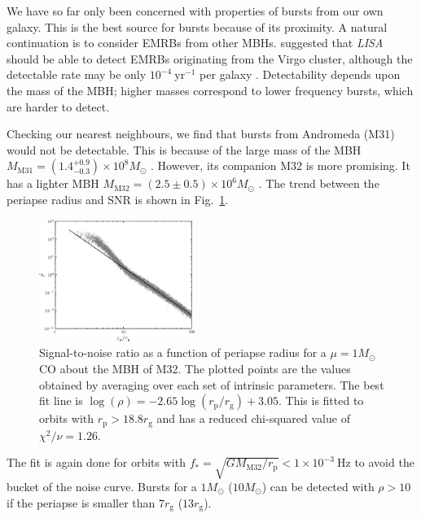 \documentclass[useAMS,usedcolumn,usegraphicx,usenatbib]{mn2e}
\newcommand{\figref}[1]{Fig.~\ref{fig:#1}}
\newcommand{\units}[1]{\ensuremath{~\mathrm{#1}}}
\newcommand{\sub}[1]{\ensuremath{_\mathrm{#1}}}
\begin{document}
We have so far only been concerned with properties of bursts from our own galaxy. This is the best source for bursts because of its proximity. A natural continuation is to consider EMRBs from other MBHs. \citet{Rubbo2006} suggested that \textit{LISA} should be able to detect EMRBs originating from the Virgo cluster, although the detectable rate may be only $10^{-4}\units{yr^{-1}}$ per galaxy \citep{Hopman2007}. Detectability depends upon the mass of the MBH; higher masses correspond to lower frequency bursts, which are harder to detect.

Checking our nearest neighbours, we find that bursts from Andromeda (M31) would not be detectable. This is because of the large mass of the MBH $M\sub{M31} = (1.4^{+0.9}_{-0.3}) \times 10^8 M_\odot$ \citep{Bender2005}. However, its companion M32 is more promising. It has a lighter MBH $M\sub{M32} = (2.5 \pm 0.5) \times 10^6 M_\odot$ \citep{Verolme2002}. The trend between the periapse radius and SNR is shown in \figref{SNR-M32}.
\begin{figure}
  \begin{center}
  \includegraphics[width=0.45\textwidth]{Fig_SNR_M32}
    \caption{Signal-to-noise ratio as a function of periapse radius for a $\mu = 1 M_\odot$ CO about the MBH of M32. The plotted points are the values obtained by averaging over each set of intrinsic parameters. The best fit line is $\log\left(\rho\right) = -2.65\log(r\sub{p}/r\sub{g}) + 3.05$. This is fitted to orbits with $r\sub{p} > 18.8 r\sub{g}$ and has a reduced chi-squared value of $\chi^2/\nu = 1.26$.\label{fig:SNR-M32}}
  \end{center}
\end{figure}
The fit is again done for orbits with $f_\ast = \sqrt{GM\sub{M32}/r\sub{p}} < 1 \times 10^{-3}\units{Hz}$ to avoid the bucket of the noise curve. Bursts for a $1 M_\odot$ ($10 M_\odot$) can be detected with $\rho > 10$ if the periapse is smaller than $7 r\sub{g}$ ($13 r\sub{g}$).
\end{document}

